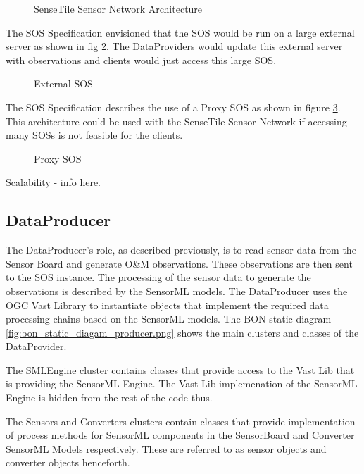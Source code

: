 \documentclass[]{final_report}
\begin{document}
\begin{figure}[h]
\caption{SenseTile Sensor Network Architecture}\label{fig:Deployment_network}
\end{figure}
The SOS Specification envisioned that the SOS would be run on a large external server as shown in fig \ref{fig:Deployment_ext_sos}. The DataProviders would update this external server with observations and clients would just access this large SOS.
\begin{figure}[h]
\caption{External SOS}\label{fig:Deployment_ext_sos}
\end{figure}
The SOS Specification describes the use of a Proxy SOS as shown in figure \ref{fig:Deployment_sos_aggr}. This architecture could be used with the SenseTile Sensor Network if accessing many SOSs is not feasible for the clients.
\begin{figure}[h]
\caption{Proxy SOS}\label{fig:Deployment_sos_aggr}
\end{figure}

Scalability - info here.

\newpage
\subsection{DataProducer}
The DataProducer's role, as described previously, is to read sensor data from the Sensor Board and generate O\&M observations. These observations are then sent to the SOS instance. The processing of the sensor data to generate the observations is described by the SensorML models. The DataProducer uses the OGC Vast Library to instantiate objects that implement the required data processing chains based on the SensorML models. The BON static diagram \ref{fig:bon_static_diagam_producer.png}
 shows the main clusters and classes of the DataProvider.

The SMLEngine cluster contains classes that provide access to
the Vast Lib that is providing the SensorML Engine.  The Vast Lib implemenation
of the SensorML Engine is hidden from the rest of the code thus.

The Sensors and Converters clusters contain classes that provide
implementation of process methods for SensorML components in the SensorBoard and
Converter SensorML Models respectively. These are referred to as sensor objects and
converter objects henceforth.
\end{document}
